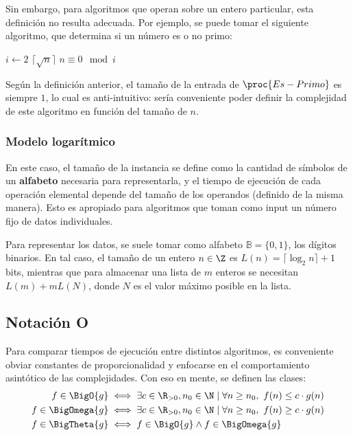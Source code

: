 Sin embargo, para algoritmos que operan sobre un entero particular, esta definición no resulta adecuada. Por ejemplo, se puede tomar el siguiente algoritmo, que determina si un número es o no primo:
\begin{codebox}
    \li \For $i \gets 2$ \To $\lceil\sqrt{n}\rceil$ \Do
    \li \If $n \equiv 0 \mod{i}$ \Then
    \li \Return {}
    \End
    \End
    \li \Return {}
\end{codebox}

Según la definición anterior, el tamaño de la entrada de $\proc{Es-Primo}$ es siempre $1$, lo cual es anti-intuitivo: sería conveniente poder definir la complejidad de este algoritmo en función del tamaño de $n$.

\subsubsection{Modelo logarítmico}

En este caso, el tamaño de la instancia se define como la cantidad de símbolos de un \textbf{alfabeto} necesaria para representarla, y el tiempo de ejecución de cada operación elemental depende del tamaño de los operandos (definido de la misma manera). Esto es apropiado para algoritmos que toman como input un número fijo de datos individuales.

Para representar los datos, se suele tomar como alfabeto $\mathbb{B} = \{0, 1\}$, los dígitos binarios. En tal caso, el tamaño de un entero $n \in \Z$ es $L(n) = \lceil\log_2{n}\rceil + 1$ bits, mientras que para almacenar una lista de $m$ enteros se necesitan $L(m) + mL(N)$, donde $N$ es el valor máximo posible en la lista.

\subsection{Notación O}

Para comparar tiempos de ejecución entre distintos algoritmos, es conveniente obviar constantes de proporcionalidad y enfocarse en el comportamiento asintótico de las complejidades. Con eso en mente, se definen las clases:
\begin{align*}
    f \in \BigO{g}     & \iff \exists c \in \R_{>0}, n_0 \in \N \mid \forall n \geq n_0,\ f(n) \leq c \cdot g(n) \\
    f \in \BigOmega{g} & \iff \exists c \in \R_{>0}, n_0 \in \N \mid \forall n \geq n_0,\ f(n) \geq c \cdot g(n) \\
    f \in \BigTheta{g} & \iff f \in \BigO{g} \land f \in \BigOmega{g}
\end{align*}

